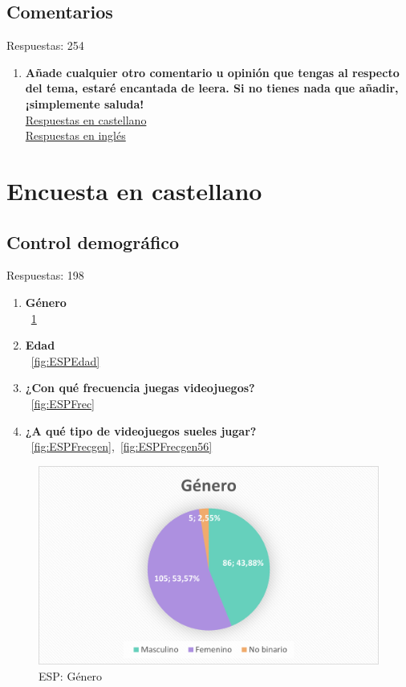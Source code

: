 \documentclass[12pt, a4paper,twoside,titlepage]{book}
\begin{document}
\subsection{Comentarios}
Respuestas: 254
\begin{enumerate}[label=\textbf{\arabic*}.]
     \item \textbf{Añade cualquier otro comentario u opinión que tengas al respecto del tema, estaré encantada de leera. Si no tienes nada que añadir, ¡simplemente saluda!}\\
     \hyperref[comentariosCastellano]{Respuestas en castellano}\\
     \hyperref[comentariosIngles]{Respuestas en inglés}
\end{enumerate}




\newpage
\section{Encuesta en castellano}



\subsection{Control demográfico}
Respuestas: 198
\begin{enumerate}[label=\textbf{\arabic*}.]
     \item \textbf{Género}\\
    ~\ref{fig:ESPGen}
     \item \textbf{Edad }\\
    ~\ref{fig:ESPEdad}
     \item \textbf{¿Con qué frecuencia juegas videojuegos?}\\
    ~\ref{fig:ESPFrec}
     \item \textbf{¿A qué tipo de videojuegos sueles jugar? }\\
    ~\ref{fig:ESPFrecgen},~\ref{fig:ESPFrecgen56}
\end{enumerate}


\begin{figure}
    \centering
    \includegraphics[width=.8\linewidth]{ANEXO ESP/1AnexESPGen}
    \caption{ESP: Género}
    \label{fig:ESPGen}
\end{figure}
\end{document}

